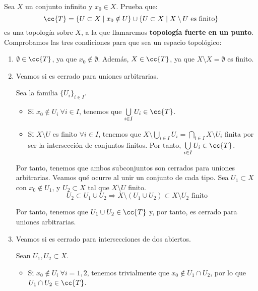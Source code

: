 \begin{ejercicio}
    Sea $X$ un conjunto infinito y $x_0\in X$. Prueba que:
    \begin{equation*}
        \cc{T}=\{U\subset X\mid x_0\notin U\}\cup \{U\subset X\mid X\setminus U \text{ es finito}\}
    \end{equation*}
    es una topología sobre $X$, a la que llamaremos \textbf{topología fuerte en un punto}.\\
        
    Comprobamos las tres condiciones para que sea un espacio topológico:
    \begin{enumerate}
        \item $\emptyset \in \cc{T}$, ya que $x_0\notin \emptyset$. Además, $X\in \cc{T}$, ya que $X\setminus X = \emptyset$ es finito.
        
        \item Veamos si es cerrado para uniones arbitrarias.

        Sea la familia $\{U_i\}_{i\in I}$.
        \begin{itemize}
            \item Si $x_0\notin U_i~\forall i\in I$, tenemos que $\bigcup\limits_{i\in I}U_i\in \cc{T}$.
            \item Si $X\setminus U$ es finito $\forall i\in I$, tenemos que $X\setminus \bigcup\limits_{i\in I}U_i = \bigcap\limits_{i\in I}X\setminus U_i$ finita por ser la intersección de conjuntos finitos. Por tanto, $\bigcup\limits_{i\in I}U_i\in \cc{T}$.
        \end{itemize}
        Por tanto, tenemos que ambos subconjuntos son cerrados para uniones arbitrarias. Veamos qué ocurre al unir un conjunto de cada tipo. Sea $U_1\subset X$ con $x_0\notin U_1$, y $U_2\subset X$ tal que $X\setminus U$ finito.
        \begin{equation*}
            U_2\subset U_1\cup U_2 \Longrightarrow X\setminus (U_1\cup U_2) \subset X\setminus  U_2 \text{ finito}
        \end{equation*}

        Por tanto, tenemos que $U_1\cup U_2\in \cc{T}$ y, por tanto, es cerrado para uniones arbitrarias.

        \item Veamos si es cerrado para intersecciones de dos abiertos.

        Sean $U_1, U_2\subset X$.
        \begin{itemize}
            \item Si $x_0\notin U_i~\forall i=1,2$, tenemos trivialmente que $x_0\notin U_1\cap U_2$, por lo que $U_1\cap U_2\in \cc{T}$.
            

\end{itemize}
\end{enumerate}
\end{ejercicio}

